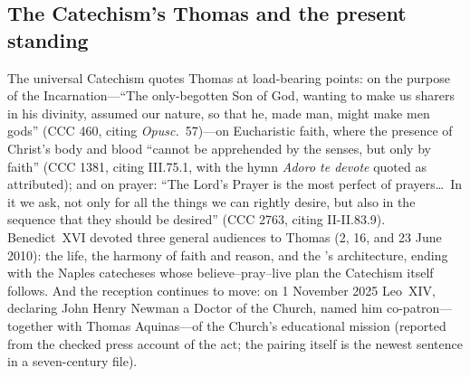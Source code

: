 \subsection{The Catechism's Thomas and the present standing}

The universal Catechism quotes Thomas at load-bearing points: on the
purpose of the Incarnation---``The only-begotten Son of God, wanting to
make us sharers in his divinity, assumed our nature, so that he, made
man, might make men gods'' (CCC 460, citing \textit{Opusc.}~57)---on
Eucharistic faith, where the presence of Christ's body and blood
``cannot be apprehended by the senses, but only by faith'' (CCC 1381,
citing  III.75.1, with the hymn \textit{Adoro te
devote} quoted as attributed); and on prayer: ``The Lord's Prayer is
the most perfect of prayers\ldots\ In it we ask, not only for all the
things we can rightly desire, but also in the sequence that they should
be desired'' (CCC 2763, citing II-II.83.9). Benedict~XVI devoted three
general audiences to Thomas (2, 16, and 23 June 2010): the life, the
harmony of faith and reason, and the 's architecture,
ending with the Naples catecheses whose believe--pray--live plan the
Catechism itself follows. And the reception continues to move: on 1
November 2025 Leo~XIV, declaring John Henry Newman a Doctor of the
Church, named him co-patron---together with Thomas Aquinas---of the
Church's educational mission (reported from the checked press account
of the act; the pairing itself is the newest sentence in a
seven-century file).

